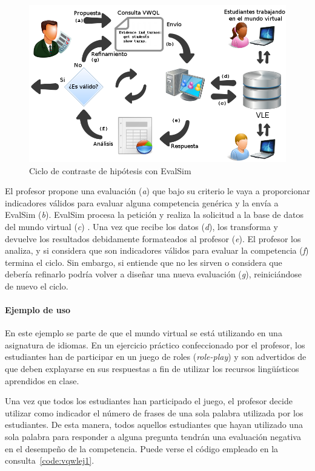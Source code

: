 \begin{figure}
  \begin{center}
    \includegraphics[scale=0.4]{EvsDiagram.png}
  \end{center}
  \caption{Ciclo de contraste de hipótesis con EvalSim}
  \label{fig:EvsDiagram}
\end{figure}

El profesor propone una evaluación (\emph{a}) que bajo su criterio le vaya a proporcionar indicadores válidos para evaluar alguna competencia genérica y la envía a EvalSim (\emph{b}). EvalSim procesa la petición y realiza la solicitud a la base de datos del mundo virtual (\emph{c}) . Una vez que recibe los datos (\emph{d}), los transforma y devuelve los resultados debidamente formateados al profesor (\emph{e}). El profesor los analiza, y si considera que son indicadores válidos para evaluar la competencia (\emph{f}) termina el ciclo. Sin embargo, si entiende que no les sirven o considera que debería refinarlo podría volver a diseñar una nueva evaluación (\emph{g}), reiniciándose de nuevo el ciclo.


\paragraph*{Ejemplo de uso}

En este ejemplo se parte de que el mundo virtual se está utilizando en una asignatura de idiomas. En un ejercicio práctico confeccionado por el profesor, los estudiantes han de participar en un juego de roles (\emph{role-play}) y son advertidos de que deben explayarse en sus respuestas a fin de utilizar los recursos lingüísticos aprendidos en clase.

Una vez que todos los estudiantes han participado el juego, el profesor decide utilizar como indicador el número de frases de una sola palabra utilizada por los estudiantes. De esta manera, todos aquellos estudiantes que hayan utilizado una sola palabra para responder a alguna pregunta tendrán una evaluación negativa en el desempeño de la competencia. Puede verse el código empleado en la consulta~\ref{code:vqwlej1}.

